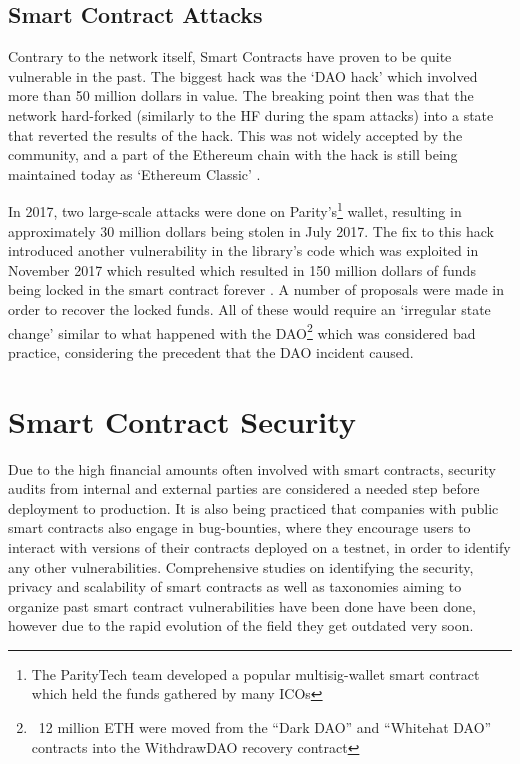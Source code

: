 \subsection{Smart Contract Attacks}
Contrary to the network itself, Smart Contracts have proven to be quite vulnerable in the past. The biggest hack was the `DAO hack' which involved more than 50 million dollars in value. The breaking point then was that the network hard-forked (similarly to the HF during the spam attacks) into a state that reverted the results of the hack. This was not widely accepted by the community, and a part of the Ethereum chain with the hack is still being maintained today as `Ethereum Classic' \cite{etc}. 

In 2017, two large-scale attacks were done on Parity's\footnote{The ParityTech team developed a popular multisig-wallet smart contract which held the funds gathered by many ICOs} wallet, resulting in  approximately 30 million dollars being stolen in July 2017\cite{parityhack}. The fix to this hack introduced another vulnerability in the library's code which was exploited in November 2017 which resulted which resulted in 150 million dollars of funds being locked in the smart contract forever \cite{paritypostmortem}. A number of proposals were made \cite{eip867} in order to recover the locked funds. All of these would require an `irregular state change' similar to what happened with the DAO\footnote{~12 million ETH were moved from the “Dark DAO” and “Whitehat DAO” contracts into the WithdrawDAO recovery contract\cite{daofork2}} which was considered bad practice, considering the precedent that the DAO incident caused.

\section{Smart Contract Security}
Due to the high financial amounts often involved with smart contracts, security audits from internal and external parties are considered a needed step before deployment to production. It is also being practiced that companies with public smart contracts also engage in bug-bounties, where they encourage users to interact with versions of their contracts deployed on a testnet, in order to identify any other vulnerabilities. Comprehensive studies on identifying the security, privacy and scalability of smart contracts \cite{DBLP:journals/corr/abs-1710-06372} as well as taxonomies aiming to organize past smart contract vulnerabilities have been done \cite{Atzei:2017:SAE:3080353.3080363,tools} have been done, however due to the rapid evolution of the field they get outdated very soon. 

